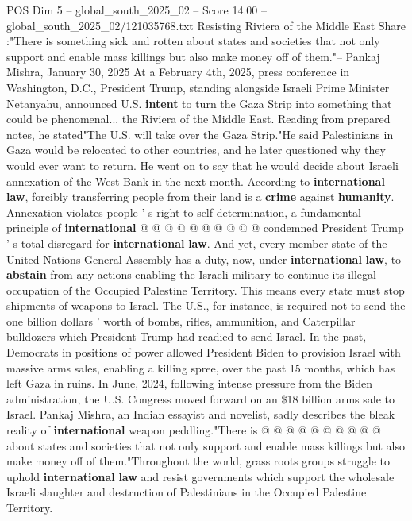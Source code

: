 \begin{textsample}{POS Dim 5 – global\_south\_2025\_02 – Score 14.00 – global\_south\_2025\_02/121035768.txt}  \label{ex:f5_pos_220}
Resisting Riviera of the Middle East Share :"There is something sick and rotten about states and societies that not only support and enable mass killings but also make money off of them."-- Pankaj Mishra, January 30, 2025 At a February 4th, 2025, press conference in Washington, D.C., President Trump, standing alongside Israeli Prime Minister Netanyahu, announced U.S. \textbf{intent} to turn the Gaza Strip into something that could be phenomenal... the Riviera of the Middle East.
Reading from prepared notes, he stated"The U.S. will take over the Gaza Strip."He said Palestinians in Gaza would be relocated to other countries, and he later questioned why they would ever want to return.
He went on to say that he would decide about Israeli annexation of the West Bank in the next month.
According to \textbf{international} \textbf{law}, forcibly transferring people from their land is a \textbf{crime} against \textbf{humanity}.
Annexation violates people ' s right to self-determination, a fundamental principle of \textbf{international} @ @ @ @ @ @ @ @ @ @ condemned President Trump ' s total disregard for \textbf{international} \textbf{law}.
And yet, every member state of the United Nations General Assembly has a duty, now, under \textbf{international} \textbf{law}, to \textbf{abstain} from any actions enabling the Israeli military to continue its illegal occupation of the Occupied Palestine Territory.
This means every state must stop shipments of weapons to Israel.
The U.S., for instance, is required not to send the one billion dollars ' worth of bombs, rifles, ammunition, and Caterpillar bulldozers which President Trump had readied to send Israel.
In the past, Democrats in positions of power allowed President Biden to provision Israel with massive arms sales, enabling a killing spree, over the past 15 months, which has left Gaza in ruins.
In June, 2024, following intense pressure from the Biden administration, the U.S.
Congress moved forward on an \$18 billion arms sale to Israel.
Pankaj Mishra, an Indian essayist and novelist, sadly describes the bleak reality of \textbf{international} weapon peddling."There is @ @ @ @ @ @ @ @ @ @ about states and societies that not only support and enable mass killings but also make money off of them."Throughout the world, grass roots groups struggle to uphold \textbf{international} \textbf{law} and resist governments which support the wholesale Israeli slaughter and destruction of Palestinians in the Occupied Palestine Territory.

\end{textsample}
